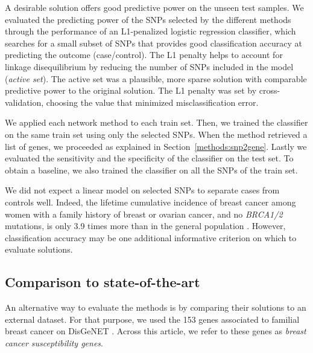 \documentclass[10pt,letterpaper]{article}
\begin{document}
A desirable solution offers good predictive power on the unseen test samples. We evaluated the predicting power of the SNPs selected by the different methods through the performance of an L1-penalized logistic regression classifier, which searches for a small subset of SNPs that provides good classification accuracy at predicting the outcome (case/control). The L1 penalty helps to account for linkage disequilibrium by reducing the number of SNPs included in the model (\emph{active set}). The active set was a plausible, more sparse solution with comparable predictive power to the original solution. The L1 penalty was set by cross-validation, choosing the value that minimized misclassification error.

We applied each network method to each train set. Then, we trained the classifier on the same train set using only the selected SNPs. When the method retrieved a list of genes, we proceeded as explained in Section~\ref{methods:snp2gene}. Lastly we evaluated the sensitivity and the specificity of the classifier on the test set. To obtain a baseline, we also trained the classifier on all the SNPs of the train set.

We did not expect a linear model on selected SNPs to separate cases from controls well. Indeed, the lifetime cumulative incidence of breast cancer among women with a family history of breast or ovarian cancer, and no \emph{BRCA1/2} mutations, is only 3.9 times more than in the general population \cite{Metcalfe2008}. However, classification accuracy may be one additional informative criterion on which to evaluate solutions.

\subsection{Comparison to state-of-the-art}
\label{methods:bcac}

An alternative way to evaluate the methods is by comparing their solutions to an external dataset. For that purpose, we used the 153 genes associated to familial breast cancer on DisGeNET \cite{pinero_disgenet:_2017}. Across this article, we refer to these genes as \emph{breast cancer susceptibility genes}.
\end{document}
